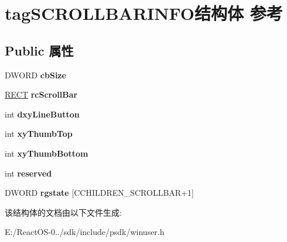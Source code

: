 \hypertarget{structtag_s_c_r_o_l_l_b_a_r_i_n_f_o}{}\section{tag\+S\+C\+R\+O\+L\+L\+B\+A\+R\+I\+N\+F\+O结构体 参考}
\label{structtag_s_c_r_o_l_l_b_a_r_i_n_f_o}
\subsection*{Public 属性}
\begin{DoxyCompactItemize}
\item 
\mbox{\label{structtag_s_c_r_o_l_l_b_a_r_i_n_f_o_ac38a642288ba76a38b97d51229cb9b69}} 
D\+W\+O\+RD {\bfseries cb\+Size}
\item 
\mbox{\label{structtag_s_c_r_o_l_l_b_a_r_i_n_f_o_a8358daeacb073f48813e0580b4f2bf71}} 
\hyperlink{structtag_r_e_c_t}{R\+E\+CT} {\bfseries rc\+Scroll\+Bar}
\item 
\mbox{\label{structtag_s_c_r_o_l_l_b_a_r_i_n_f_o_a25c14824b2e98a05b033096173dc6f70}} 
int {\bfseries dxy\+Line\+Button}
\item 
\mbox{\label{structtag_s_c_r_o_l_l_b_a_r_i_n_f_o_a4a0bca91c80227dfab312d446d812441}} 
int {\bfseries xy\+Thumb\+Top}
\item 
\mbox{\label{structtag_s_c_r_o_l_l_b_a_r_i_n_f_o_a1a2f85556c57e900f5c13d25fab44928}} 
int {\bfseries xy\+Thumb\+Bottom}
\item 
\mbox{\label{structtag_s_c_r_o_l_l_b_a_r_i_n_f_o_a0bd189d3d4da0e3ced5f71438b728dec}} 
int {\bfseries reserved}
\item 
\mbox{\label{structtag_s_c_r_o_l_l_b_a_r_i_n_f_o_a6c9187ba64203e04a33437b4acd1178b}} 
D\+W\+O\+RD {\bfseries rgstate} \mbox{[}C\+C\+H\+I\+L\+D\+R\+E\+N\+\_\+\+S\+C\+R\+O\+L\+L\+B\+AR+1\mbox{]}
\end{DoxyCompactItemize}


该结构体的文档由以下文件生成\+:\begin{DoxyCompactItemize}
\item 
E\+:/\+React\+O\+S-\/0../sdk/include/psdk/winuser.\+h\end{DoxyCompactItemize}
